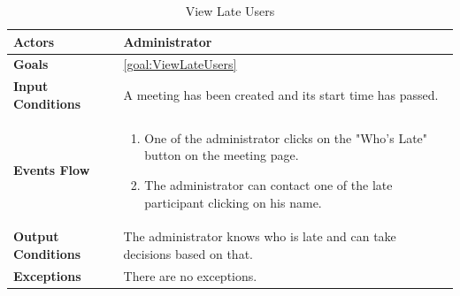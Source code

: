 \begin{table}[H]
	\centering
	\def\arraystretch{1.5}
	\begin{tabular}{|p{7cm}|p{7cm}|}
		\hline
		\textbf{Actors}            & Administrator    \\ \hline
		\textbf{Goals}             & \ref{goal:ViewLateUsers}           \\ \hline
		\textbf{Input Conditions}  & A meeting has been created and its start time has passed.         \\ \hline
		\textbf{Events Flow}       &  
		\begin{enumerate}[topsep=0pt, leftmargin=*]
			\item One of the administrator clicks on the "Who's Late" button on the meeting page.
			\item The administrator can contact one of the late participant clicking on his name.
		\end{enumerate}             \\ \hline
		\textbf{Output Conditions} & The administrator knows who is late and can take decisions based on that.           \\ \hline
		\textbf{Exceptions}        & There are no exceptions.           \\ \hline
	\end{tabular}
	\caption{View Late Users}
\end{table}

